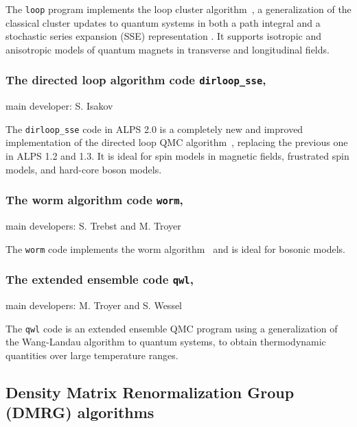 \documentclass[12pt]{iopart}
\begin{document}
\smallskip

\noindent The {\tt loop} program implements the loop cluster
algorithm~\cite{Evertz93,Todo01,looper, Evertz03}, a generalization of the classical cluster updates \cite{Swendsen87,Wolff89} to quantum systems in both a path integral and a stochastic series expansion (SSE) representation \cite{Sandvik91,Sandvik99}. It supports isotropic and anisotropic models of quantum magnets in transverse and longitudinal fields.


\subsubsection{The directed loop algorithm code {\tt dirloop\_sse},} main developer: S. Isakov

\smallskip

\noindent The {\tt dirloop\_sse} code in ALPS 2.0 is a completely new and improved implementation of the directed loop QMC algorithm~\cite{Sylyuasen,Alet2005}, replacing the previous one in ALPS 1.2 and 1.3.  It is ideal for spin models in magnetic fields, frustrated spin models, and hard-core boson models.
 
\subsubsection{The worm algorithm code {\tt worm},} main developers: S. Trebst and M. Troyer

\smallskip

\noindent The {\tt worm} code implements the worm algorithm~\cite{Prokofev98A} and is ideal for bosonic models.


\subsubsection{The extended ensemble code {\tt qwl},} main developers: M. Troyer and S. Wessel

\smallskip

\noindent The {\tt qwl} code is an extended ensemble QMC program using a generalization of the Wang-Landau\cite{Wang01,Wang01b} algorithm to quantum systems,\cite{Troyer03} to obtain thermodynamic quantities over large temperature ranges.

 
\subsection{Density Matrix Renormalization Group (DMRG) algorithms} 
\end{document}

